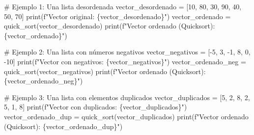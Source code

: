 \documentclass[
  spanish,
  letterpaper,
  DIV=11,
  numbers=noendperiod]{scrreprt}
\newenvironment{Shaded}{\begin{snugshade}}{\end{snugshade}}
\newcommand{\BuiltInTok}[1]{\textcolor[rgb]{0.00,0.23,0.31}{#1}}
\newcommand{\CommentTok}[1]{\textcolor[rgb]{0.37,0.37,0.37}{#1}}
\newcommand{\DecValTok}[1]{\textcolor[rgb]{0.68,0.00,0.00}{#1}}
\newcommand{\NormalTok}[1]{\textcolor[rgb]{0.00,0.23,0.31}{#1}}
\newcommand{\OperatorTok}[1]{\textcolor[rgb]{0.37,0.37,0.37}{#1}}
\newcommand{\SpecialCharTok}[1]{\textcolor[rgb]{0.37,0.37,0.37}{#1}}
\newcommand{\SpecialStringTok}[1]{\textcolor[rgb]{0.13,0.47,0.30}{#1}}
\begin{document}
\begin{Shaded}
\begin{Highlighting}[]
\CommentTok{\# Ejemplo 1: Una lista desordenada}
\NormalTok{vector\_desordenado }\OperatorTok{=}\NormalTok{ [}\DecValTok{10}\NormalTok{, }\DecValTok{80}\NormalTok{, }\DecValTok{30}\NormalTok{, }\DecValTok{90}\NormalTok{, }\DecValTok{40}\NormalTok{, }\DecValTok{50}\NormalTok{, }\DecValTok{70}\NormalTok{]}
\BuiltInTok{print}\NormalTok{(}\SpecialStringTok{f"Vector original: }\SpecialCharTok{\{}\NormalTok{vector\_desordenado}\SpecialCharTok{\}}\SpecialStringTok{"}\NormalTok{)}
\NormalTok{vector\_ordenado }\OperatorTok{=}\NormalTok{ quick\_sort(vector\_desordenado)}
\BuiltInTok{print}\NormalTok{(}\SpecialStringTok{f"Vector ordenado (Quicksort): }\SpecialCharTok{\{}\NormalTok{vector\_ordenado}\SpecialCharTok{\}}\SpecialStringTok{"}\NormalTok{)}

\CommentTok{\# Ejemplo 2: Una lista con números negativos}
\NormalTok{vector\_negativos }\OperatorTok{=}\NormalTok{ [}\OperatorTok{{-}}\DecValTok{5}\NormalTok{, }\DecValTok{3}\NormalTok{, }\OperatorTok{{-}}\DecValTok{1}\NormalTok{, }\DecValTok{8}\NormalTok{, }\DecValTok{0}\NormalTok{, }\OperatorTok{{-}}\DecValTok{10}\NormalTok{]}
\BuiltInTok{print}\NormalTok{(}\SpecialStringTok{f"Vector con negativos: }\SpecialCharTok{\{}\NormalTok{vector\_negativos}\SpecialCharTok{\}}\SpecialStringTok{"}\NormalTok{)}
\NormalTok{vector\_ordenado\_neg }\OperatorTok{=}\NormalTok{ quick\_sort(vector\_negativos)}
\BuiltInTok{print}\NormalTok{(}\SpecialStringTok{f"Vector ordenado (Quicksort): }\SpecialCharTok{\{}\NormalTok{vector\_ordenado\_neg}\SpecialCharTok{\}}\SpecialStringTok{"}\NormalTok{)}

\CommentTok{\# Ejemplo 3: Una lista con elementos duplicados}
\NormalTok{vector\_duplicados }\OperatorTok{=}\NormalTok{ [}\DecValTok{5}\NormalTok{, }\DecValTok{2}\NormalTok{, }\DecValTok{8}\NormalTok{, }\DecValTok{2}\NormalTok{, }\DecValTok{5}\NormalTok{, }\DecValTok{1}\NormalTok{, }\DecValTok{8}\NormalTok{]}
\BuiltInTok{print}\NormalTok{(}\SpecialStringTok{f"Vector con duplicados: }\SpecialCharTok{\{}\NormalTok{vector\_duplicados}\SpecialCharTok{\}}\SpecialStringTok{"}\NormalTok{)}
\NormalTok{vector\_ordenado\_dup }\OperatorTok{=}\NormalTok{ quick\_sort(vector\_duplicados)}
\BuiltInTok{print}\NormalTok{(}\SpecialStringTok{f"Vector ordenado (Quicksort): }\SpecialCharTok{\{}\NormalTok{vector\_ordenado\_dup}\SpecialCharTok{\}}\SpecialStringTok{"}\NormalTok{)}
\end{Highlighting}
\end{Shaded}
\end{document}
